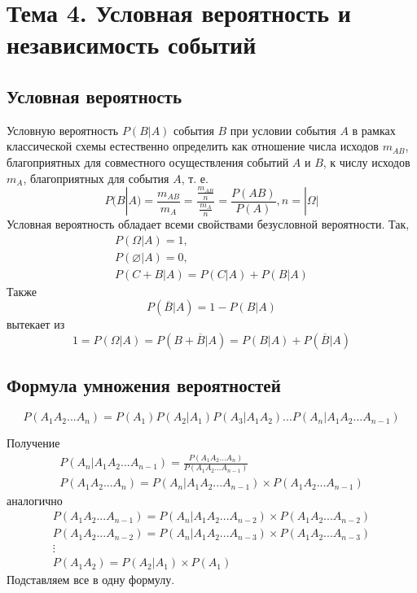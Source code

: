 \documentclass[12pt]{article}
\begin{document}
\section{Тема 4. Условная вероятность и независимость событий}

\subsection{Условная вероятность}
Условную вероятность $P(B|A)$ события $B$ при условии события $A$ в рамках классической схемы
естественно определить как отношение числа исходов $m_{AB}$,
благоприятных для совместного осуществления событий $A$ и $B$,
к числу исходов $m_A$, благоприятных для события $A$, т. е.
\[P(B|A) = \frac{m_{AB}}{m_A} = \frac{\frac{m_{AB}}{n}}{\frac{m_A}{n}} = \frac{P(AB)}{P(A)}, n = |\Omega|\]
Условная вероятность обладает всеми свойствами безусловной вероятности. Так,
\begin{gather*}
	P(\Omega|A) = 1, \\
	P(\varnothing|A) = 0, \\
	P(C+B|A) = P(C|A) + P(B|A)
\end{gather*}
Также
\[P(\overline{B}|A) = 1 - P(B|A)\]
вытекает из
\[1 = P(\Omega|A) = P(B + \overline{B}|A) = P(B|A) + P(\overline{B}|A)\]

\subsection{Формула умножения вероятностей}
\[P(A_1A_2...A_n) = P(A_1)P(A_2|A_1)P(A_3|A_1A_2)...P(A_n|A_1A_2...A_{n-1})\]

Получение
\begin{gather*}
	P(A_n|A_1A_2...A_{n-1}) = \frac{P(A_1A_2...A_n)}{P(A_1A_2...A_{n-1})} \\
	P(A_1A_2...A_n) = P(A_n|A_1A_2...A_{n-1}) \times P(A_1A_2...A_{n-1})
\end{gather*}
аналогично
\begin{gather*}
	P(A_1A_2...A_{n-1}) = P(A_n|A_1A_2...A_{n-2}) \times P(A_1A_2...A_{n-2}) \\
	P(A_1A_2...A_{n-2}) = P(A_n|A_1A_2...A_{n-3}) \times P(A_1A_2...A_{n-3}) \\
	\vdots \\
	P(A_1A_2) = P(A_2|A_1) \times P(A_1)
\end{gather*}
Подставляем все в одну формулу.
\end{document}

